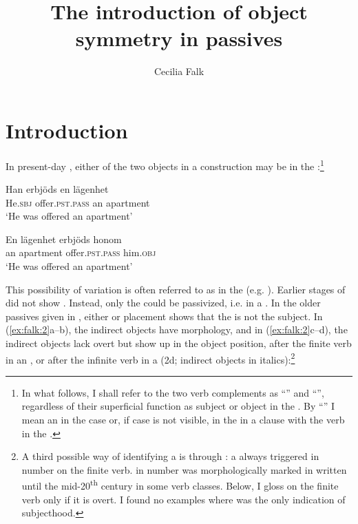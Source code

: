 \documentclass[output=paper]{langscibook}
\author{Cecilia Falk\affiliation{Stockholm University}}
\title{The introduction of object symmetry in passives}
\begin{document}
\maketitle


\section{Introduction}


In present-day , either of the two objects in a  construction may be  in the :\footnote{In what follows, I shall refer to the two verb complements as “” and “”, regardless of their superficial function as subject or object in the . By “” I mean an  in the  case or, if case is not visible, in the  in a clause with the verb in the .}

\ea%
    \label{ex:falk:1}
\ea
\gll Han    erbjöds      en  lägenhet\\
      He.\textsc{sbj}  offer.\textsc{pst}.\textsc{pass}  an  apartment\\
\glt ‘He was offered an apartment’

\ex
\gll En    lägenhet      erbjöds      honom\\
      an    apartment    offer.\textsc{pst}.\textsc{pass} him.\textsc{obj}\\
\glt ‘He was offered an apartment’
\z
\z


This possibility of variation is often referred to as  in the  (e.g. \citealt{Anagnostopoulou2003}). Earlier stages of  did not show . Instead, only the  could be passivized, i.e.  in a . In the older  passives given in , either  or placement shows that the  is not the subject. In (\ref{ex:falk:2}a–b), the indirect objects have  morphology, and in (\ref{ex:falk:2}c–d), the indirect objects lack overt  but show up in the object position, after the finite verb in an  , or after the infinite verb in a  (2d; indirect objects in italics):\footnote{A third possible way of identifying a  is through : a  always triggered  in number on the finite verb.  in number was morphologically marked in written  until the mid-20\textsuperscript{th} century in some verb classes. Below, I gloss  on the finite verb only if it is overt. I found no examples where  was the only indication of subjecthood.}
\end{document}
